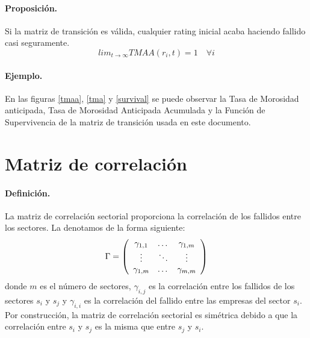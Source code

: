 \paragraph{Proposici\'on.} Si la matriz de transici\'on es v\'alida, cualquier 
rating inicial acaba haciendo fallido casi seguramente.
\begin{displaymath}
lim_{t \to \infty} TMAA(r_i, t) =  1 \quad \forall i
\end{displaymath}

\paragraph{Ejemplo.} En las figuras \ref{tmaa}, \ref{tma} y \ref{survival} 
se puede observar la Tasa de Morosidad anticipada, Tasa de Morosidad Anticipada 
Acumulada y la Funci\'on de Supervivencia de la matriz de transici\'on usada en 
este documento.


\section{Matriz de correlaci\'on}
\label{sec:mcorrel}

\paragraph{Definici\'on.} La matriz de correlaci\'on sectorial proporciona
la correlaci\'on de los fallidos entre los sectores. La denotamos de la forma 
siguiente:
\begin{displaymath}
\Gamma = \left(
\begin{array}{ccc}
\gamma_{1,1} & \dots  & \gamma_{1,m} \cr
\vdots & \ddots & \vdots \cr
\gamma_{1,m} & \dots  & \gamma_{m,m} 
\end{array}
\right)
\end{displaymath}
donde $m$ es el n\'umero de sectores, $\gamma_{i,j}$ es la correlaci\'on entre 
los fallidos de los sectores $s_i$ y $s_j$ y $\gamma_{i,i}$ es la correlaci\'on del 
fallido entre las empresas del sector $s_i$. Por construcci\'on, la matriz de 
correlaci\'on sectorial es sim\'etrica debido a que la correlaci\'on entre $s_i$
y $s_j$ es la misma que entre $s_j$ y $s_i$.

